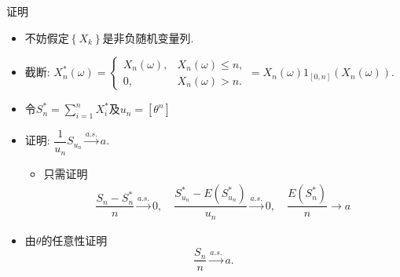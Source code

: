 \begin{frame}{证明}
	\begin{itemize}[<+-|alert@+>]
	\item 不妨假定${\left\{X_{k}\right\}}$是非负随机变量列.
	\item 截断: $X_{n}^{*}(\omega)={\left\{\begin{array}{ll}
		X_{n}(\omega), &     X_{n}(\omega) \leq n, \\
		0, &     X_{n}(\omega)>n .
		\end{array}=X_{n}(\omega) 1_{[0, n]}\left(X_{n}(\omega)\right). \right.}$
	 \item 令$S_n^*=\sum_{i=1}^nX_i^*$及$u_n=[\theta^n]$
	 \item 证明: $\dfrac{1}{u_{n}} S_{u_{n}} \stackrel{a.s.}{\rightarrow} a$.
	 \begin{itemize}[<+-|alert@+>]
	 \item 只需证明
	 \begin{align*}
		\dfrac{S_n-S_n^*}{n}\stackrel{a.s.}{\rightarrow} 0, \quad \dfrac{S_{u_n}^*-E(S_{u_n}^*)}{u_n}\stackrel{a.s.}{\rightarrow}  0, \quad \dfrac{E(S_n^*)}{n}\rightarrow a
	 \end{align*}
	\end{itemize}
    \item 由$\theta$的任意性证明
    \[
\frac{S_{n}}{n}\stackrel{a.s.}{\rightarrow} a.
\]


	\end{itemize}


\end{frame}











